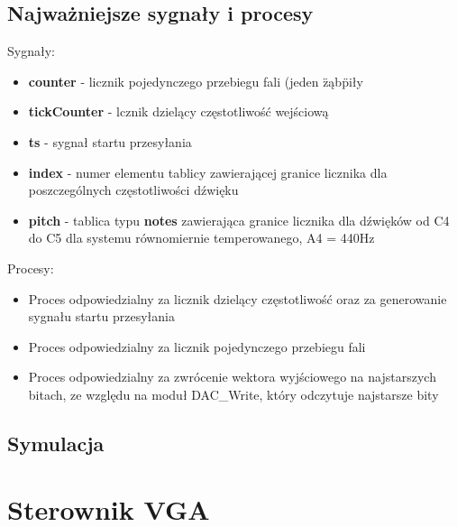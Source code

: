 \documentclass[a4paper]{report}
\begin{document}
		\subsection{Najważniejsze sygnały i procesy}
		{\Large Sygnały:}
			\begin{itemize}
				\item \textbf{counter} - licznik pojedynczego przebiegu fali (jeden \"ząb\" piły
				\item \textbf{tickCounter} - lcznik dzielący częstotliwość wejściową
				\item \textbf{ts} - sygnał startu przesyłania
				\item \textbf{index} - numer elementu tablicy zawierającej granice licznika dla poszczególnych częstotliwości dźwięku
				\item \textbf{pitch} - tablica typu \textbf{notes} zawierająca granice licznika dla dźwięków od C4 do C5 dla systemu równomiernie temperowanego, A4 = 440Hz
			\end{itemize}
		{\Large Procesy:}
			\begin{itemize}
			\item Proces odpowiedzialny za licznik dzielący częstotliwość oraz za generowanie sygnału startu przesyłania\\
				
			\item Proces odpowiedzialny za licznik pojedynczego przebiegu fali\\
				
			\item Proces odpowiedzialny za zwrócenie wektora wyjściowego na najstarszych bitach, ze względu na moduł DAC\_Write, który odczytuje najstarsze bity\\
				
			\end{itemize}
		\subsection{Symulacja}
		
		\newpage
	\section{Sterownik VGA}
\end{document}
